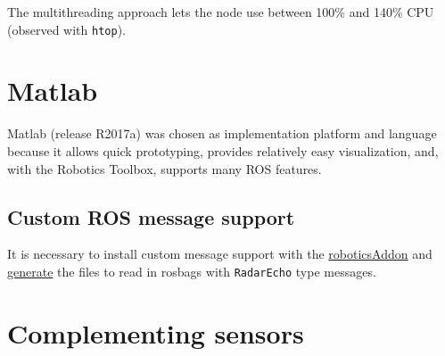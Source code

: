 \begin{samepage}
\begin{Shaded}
\begin{Highlighting}[]

\NormalTok{    [=] ()}
\NormalTok{    \{}
\NormalTok{    \}}
\NormalTok{);}
\end{Highlighting}
\end{Shaded}
\end{samepage}

The multithreading approach lets the node use between 100\% and 140\%
CPU (observed with \texttt{htop}).

\section{Matlab}\label{matlab}

Matlab (release R2017a) was chosen as implementation platform and
language because it allows quick prototyping, provides relatively easy
visualization, and, with the Robotics Toolbox, supports many ROS
features.

\subsection{Custom ROS message
support}\label{custom-ros-message-support}

It is necessary to install custom message support with the
\href{https://www.mathworks.com/help/robotics/ref/roboticsaddons.html}{roboticsAddon}
and
\href{https://www.mathworks.com/help/robotics/ug/create-custom-messages-from-ros-package.html}{generate}
the files to read in rosbags with \texttt{RadarEcho} type messages.

\section{Complementing sensors}\label{complementing-sensors}

